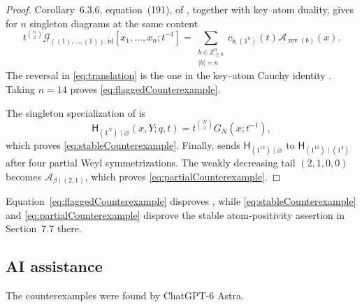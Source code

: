 \documentclass[10pt,reqno]{amsart}
\newcommand{\atomA}{\mathcal{A}}
\newcommand{\flagLLT}{\mathcal{G}}
\newcommand{\macH}{\mathsf{H}}
\begin{document}
\begin{proof}
Corollary~6.3.6, equation~(191), of
\cite{BlasiakHaimanMorsePunSeelinger2025x}, together with key--atom duality, gives
for $n$ singleton diagrams at the same content
\begin{equation}\label{eq:translation}
 t^{\binom n2}\flagLLT_{((1),\dotsc,(1)),\mathrm{id}}
 [x_1,\dotsc,x_n;t^{-1}]
 =\sum_{\substack{b\in\mathbb{Z}_{\geq0}^n\\|b|=n}}
 c_{b,(1^n)}(t)\atomA_{\operatorname{rev}(b)}(x).
\end{equation}
The reversal in \eqref{eq:translation} is the one in the key--atom Cauchy
identity \cite[equations~(43)--(44)]{BlasiakHaimanMorsePunSeelinger2025x}.
Taking $n=14$ proves \eqref{eq:flaggedCounterexample}.

The singleton specialization of
\cite[Theorem~7.6.6(b)]{BlasiakHaimanMorsePunSeelinger2025x} is
\[
 \macH_{(1^N)\mid\varnothing}(x,Y;q,t)
 =t^{\binom N2}G_N(x;t^{-1}),
\]
which proves \eqref{eq:stableCounterexample}.  Finally,
\cite[Proposition~7.8.3]{BlasiakHaimanMorsePunSeelinger2025x} sends
$\macH_{(1^{14})\mid\varnothing}$ to
$\macH_{(1^{10})\mid(1^4)}$ after four partial Weyl symmetrizations.  The
weakly decreasing tail $(2,1,0,0)$ becomes
$\atomA_{\beta\mid(2,1)}$, which proves
\eqref{eq:partialCounterexample}.
\end{proof}

Equation~\eqref{eq:flaggedCounterexample} disproves
\cite[Conjecture~6.6.1]{BlasiakHaimanMorsePunSeelinger2025x}, while
\eqref{eq:stableCounterexample} and \eqref{eq:partialCounterexample}
disprove the stable atom-positivity assertion in Section~7.7 there.

\subsection*{AI assistance}
The counterexamples were found by ChatGPT-6 Astra.



\end{document}
